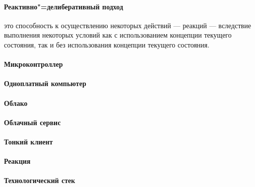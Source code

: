 \paragraph*{Реактивно"=делиберативный подход} это способность к осуществлению некоторых действий --- реакций --- вследствие выполнения некоторых условий как с использованием концепции текущего состояния, так и без использования концепции текущего состояния.

\paragraph*{Микроконтроллер}

\paragraph*{Одноплатный компьютер}

\paragraph*{Облако}

\paragraph*{Облачный сервис}

\paragraph*{Тонкий клиент}

\paragraph*{Реакция}

\paragraph*{Технологический стек}
